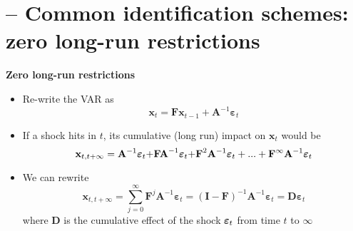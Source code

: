 \documentclass[10pt,handout]{beamer}
\begin{document}
\vspace{0.1cm}

\section{ -- Common identification schemes: zero long-run restrictions}

\begin{frame}
{\textbf{Zero long-run restrictions}}

\begin{itemize}
\item Re-write the VAR as%
\begin{equation*}
\mathbf{x}_{t}=\mathbf{Fx}_{t-1}+\mathbf{A}^{-1}\mathbf{\varepsilon }_{t}
\end{equation*}%
\pause

\item If a shock hits in $t$, its cumulative (long run) impact on $\mathbf{x}%
_{t}$ would be%
\begin{equation*}
\mathbf{x}_{t,t+\infty }=\mathbf{A}^{-1}\mathbf{\varepsilon }_{t}\mathbf{+FA}%
^{-1}\mathbf{\varepsilon }_{t}\mathbf{+F}^{2}\mathbf{A}^{-1}\mathbf{%
\varepsilon }_{t}+...+\mathbf{F}^{\infty }\mathbf{A}^{-1}\mathbf{\varepsilon 
}_{t}
\end{equation*}%
\pause\smallskip

\item We can rewrite%
\begin{equation*}
\mathbf{x}_{t,t+\infty }=\sum\limits_{j=0}^{\infty }\mathbf{F}^{j}\mathbf{A}%
^{-1}\mathbf{\varepsilon }_{t}=\left( \mathbf{I}-\mathbf{F}\right) ^{-1}%
\mathbf{A}^{-1}\mathbf{\varepsilon }_{t}=\mathbf{D\varepsilon }_{t}
\end{equation*}%
where $\mathbf{D}$ is the cumulative effect of the shock $\mathbf{%
\varepsilon }_{t}$ from time $t$ to $\infty $
\end{itemize}
\end{frame}

\vspace{.1cm}
\end{document}
